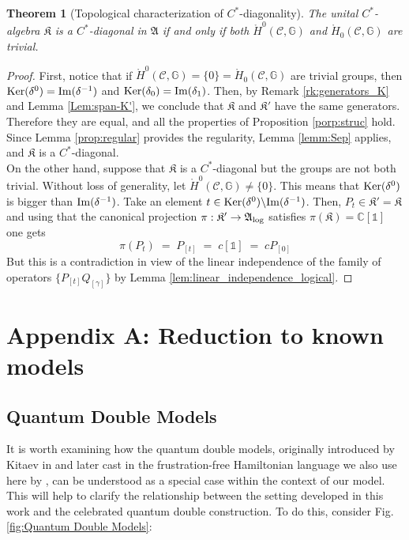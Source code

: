 \documentclass[a4paper,12pt,twoside,reqno]{amsart}
\theoremstyle{plain}
\newtheorem{teo}{Theorem}[section]
\theoremstyle{definition}
\theoremstyle{remark}
\numberwithin{equation}{section}
\numberwithin{figure}{section}
\numberwithin{table}{section}
\newcommand{\f}[1]{\mathcal{#1}}
\newcommand{\n}[1]{\mathbb{#1}}
\begin{document}
	
	\begin{teo}[Topological characterization of $C^*$-diagonality]
		The unital $C^*$-algebra $\mathfrak{K}$ is a $C^*$-diagonal in $\mathfrak{A}$ if and only if
		both
		$\mathring{H}^0(\f{C},\n{G})$ and $\mathring{H}_0(\f{C},\n{G})$
		are trivial.
	\end{teo}
	
	\begin{proof}
		First, notice that if $\mathring{H}^0(\f{C},\n{G})=\{0\}=\mathring{H}_0(\f{C},\n{G})$ are trivial groups, then ${\rm Ker}(\delta^0)={\rm Im}(\delta^{-1})$ and ${\rm Ker}(\delta_0)={\rm Im}(\delta_{1})$. Then, by Remark \ref{rk:generators_K} and Lemma \ref{Lem:span-K'}, we conclude that $\mathfrak{K}$ and $\mathfrak{K'}$ have the same generators. Therefore they are equal, and 
		all the properties of Proposition \ref{porp:struc} hold. Since
		Lemma \ref{prop:regular} provides the regularity,
		Lemma \ref{lemm:Sep} applies, and $\mathfrak{K}$ is a $C^*$-diagonal.\\
		On the other hand, suppose that $\mathfrak{K}$ is a $C^*$-diagonal  but the groups are not both trivial. Without loss of generality, let $\mathring{H}^0(\f{C},\n{G})\neq\{0\}$. This means that  ${\rm Ker}(\delta^0)$ is bigger than ${\rm Im}(\delta^{-1})$. Take an element $t\in{\rm Ker}(\delta^0)\backslash{\rm Im}(\delta^{-1})$. Then, $P_{t}\in \mathfrak{K}'=\mathfrak{K}$ and using that the canonical projection $\pi:\mathfrak{K}'\to \mathfrak{A}_{\rm{log}}$ satisfies $\pi(\mathfrak{K})=\n{C}[\n{1}]$ one gets
		\begin{equation}
			\pi(P_t)\;=\;P_{[t]}\;=\;c[\n{1}]\;=\;cP_{[0]}
		\end{equation}
		But this is a contradiction in view of the linear independence of  
		the family of operators $\{P_{[t]}Q_{[\gamma]}\}$ by Lemma \ref{lem:linear_independence_logical}.
	\end{proof}
	
	
	
	\section{Appendix A: Reduction to known models}
	
	\subsection{Quantum Double Models}
	
	\label{sec:quantum_double_models}
	It is worth examining how the quantum double models, originally introduced by Kitaev in \cite{Kitaev_2003} and later cast in the frustration-free Hamiltonian language we also use here by \cite{Ferreira:2015uia}, can be understood as a special case within the context of our model. This will help to clarify the relationship between the setting developed in this work and the celebrated quantum double construction.  To do this, consider Fig. \ref{fig:Quantum Double Models}:
	
\end{document}
